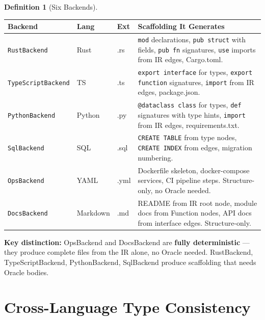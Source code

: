 \documentclass[11pt,a4paper,twoside]{article}
\theoremstyle{definition}
\newtheorem{definition}{Definition}[section]
\theoremstyle{plain}
\theoremstyle{remark}
\begin{document}
\begin{definition}[Six Backends]\label{def:backends}
\begin{tabularx}{\textwidth}{l l l X}
\toprule
\textbf{Backend} & \textbf{Lang} & \textbf{Ext} & \textbf{Scaffolding It Generates} \\
\midrule
\texttt{RustBackend} & Rust & .rs & \texttt{mod} declarations,
  \texttt{pub struct} with fields, \texttt{pub fn} signatures,
  \texttt{use} imports from IR edges, Cargo.toml. \\
\texttt{TypeScriptBackend} & TS & .ts & \texttt{export interface} for
  types, \texttt{export function} signatures, \texttt{import} from IR
  edges, package.json. \\
\texttt{PythonBackend} & Python & .py & \texttt{@dataclass class} for
  types, \texttt{def} signatures with type hints, \texttt{import} from
  IR edges, requirements.txt. \\
\texttt{SqlBackend} & SQL & .sql & \texttt{CREATE TABLE} from type
  nodes, \texttt{CREATE INDEX} from edges, migration numbering. \\
\texttt{OpsBackend} & YAML & .yml & Dockerfile skeleton,
  docker-compose services, CI pipeline steps. Structure-only,
  no Oracle needed. \\
\texttt{DocsBackend} & Markdown & .md & README from IR root node,
  module docs from Function nodes, API docs from interface edges.
  Structure-only. \\
\bottomrule
\end{tabularx}

\textbf{Key distinction:} OpsBackend and DocsBackend are
\textbf{fully deterministic} --- they produce complete files from the
IR alone, no Oracle needed. RustBackend, TypeScriptBackend,
PythonBackend, SqlBackend produce scaffolding that needs Oracle
bodies.
\end{definition}


\section{Cross-Language Type Consistency}\label{sec:crosslang}
\end{document}
